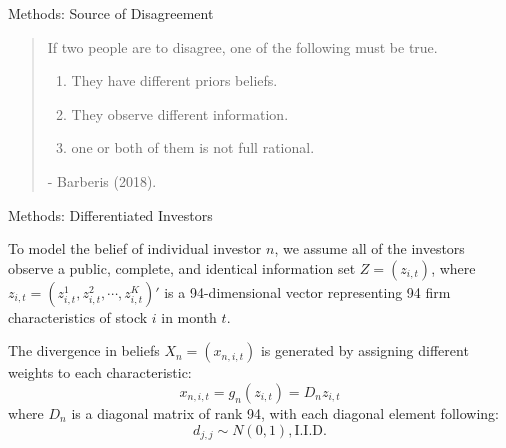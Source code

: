 \documentclass[11pt, aspectratio=169]{beamer}
\newenvironment{wideitemize}{\itemize\addtolength{\itemsep}{10pt}}{\enditemize}
\begin{document}
\begin{frame}{Methods: Source of Disagreement }
    \begin{quote}
    If two people are to disagree, one of the following must be true.
    \bigskip
    \begin{enumerate}
        \item \alert{They have different priors beliefs.}
    \bigskip
        \item They observe different information.
    \bigskip
        \item one or both of them is not full rational.
    \end{enumerate}
    \bigskip
    - Barberis (2018).
    \end{quote}
\end{frame}


\begin{frame}{Methods: Differentiated Investors}
    \bigskip
    \begin{wideitemize}
    \item To model the belief of individual investor $n$, we assume all of the investors observe a \alert{public, complete, and identical} information set $Z = (z_{i, t})$, where $z_{i,t}=(z_{i,t}^{1},z_{i,t}^{2},\cdots,z_{i,t}^{K})'$ is a 94-dimensional vector representing 94 firm characteristics of stock $i$ in month $t$. 
    \item The divergence in beliefs $X_{n} = (x_{n,i,t})$ is generated by assigning different weights to each characteristic:
    \begin{equation*}
        x_{n,i,t} = g_n(z_{i,t}) = D_{n}z_{i,t}
    \end{equation*}
    where $D_{n}$ is a diagonal matrix of rank 94, with each diagonal element following:
    \begin{equation*}
        d_{j,j} \sim N(0,1), \text{I.I.D.}
    \end{equation*}
    \end{wideitemize}
\end{frame}
\end{document}
